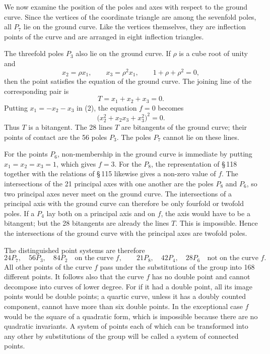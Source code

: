 \documentclass[11pt]{article}
\begin{document}
We now examine the position of the poles and axes with respect to the ground curve. Since the vertices of the coordinate triangle are among the sevenfold poles, all \(P_7\) lie on the ground curve. Like the vertices themselves, they are inflection points of the curve and are arranged in eight inflection triangles.

The threefold poles \(P_3\) also lie on the ground curve. If \(\rho\) is a cube root of unity and
\begin{equation}
x_2=\rho x_1,
\qquad
x_3=\rho^2x_1,
\qquad
1+\rho+\rho^2=0,
\end{equation}
then the point satisfies the equation of the ground curve. The joining line of the corresponding pair is
\begin{equation}
T=x_1+x_2+x_3=0.
\end{equation}
Putting \(x_1=-x_2-x_3\) in (2), the equation \(f=0\) becomes
\begin{equation}
\bigl(x_2^2+x_2x_3+x_3^2\bigr)^2=0.
\end{equation}
Thus \(T\) is a bitangent. The 28 lines \(T\) are bitangents of the ground curve; their points of contact are the 56 poles \(P_3\). The poles \(P_7\) cannot lie on these lines.

For the points \(P_6\), non-membership in the ground curve is immediate by putting \(x_1=x_2=x_3=1\), which gives \(f=3\). For the \(P_8\), the representation of \S\,118 together with the relations of \S\,115 likewise gives a non-zero value of \(f\). The intersections of the 21 principal axes with one another are the poles \(P_8\) and \(P_6\), so two principal axes never meet on the ground curve. The intersections of a principal axis with the ground curve can therefore be only fourfold or twofold poles. If a \(P_4\) lay both on a principal axis and on \(f\), the axis would have to be a bitangent; but the 28 bitangents are already the lines \(T\). This is impossible. Hence the intersections of the ground curve with the principal axes are twofold poles.

The distinguished point systems are therefore
\begin{equation}
24P_7,
\quad 56P_3,
\quad 84P_2\quad\text{on the curve }f,
\qquad
21P_8,
\quad42P_4,
\quad28P_6\quad\text{not on the curve }f.
\end{equation}
All other points of the curve \(f\) pass under the substitutions of the group into 168 different points. It follows also that the curve \(f\) has no double point and cannot decompose into curves of lower degree. For if it had a double point, all its image points would be double points; a quartic curve, unless it has a doubly counted component, cannot have more than six double points. In the exceptional case \(f\) would be the square of a quadratic form, which is impossible because there are no quadratic invariants. A system of points each of which can be transformed into any other by substitutions of the group will be called a system of connected points.
\end{document}
